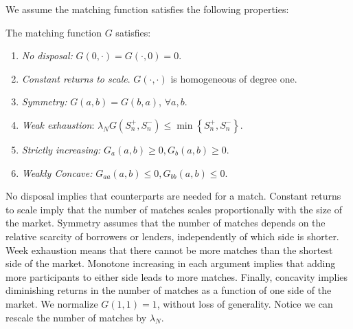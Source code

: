 \documentclass[12pt,american,english,notitlepage]{article}
\begin{document}
We assume the matching function satisfies the following properties:
\begin{assumption} \label{ass:matching} The matching
function $G$ satisfies:
\begin{enumerate}
  \renewcommand{\labelenumi}{\roman{enumi}.}
\item \textit{No disposal:} $G\left(0,\cdot\right)=G\left(\cdot,0\right)=0$.
\item \textit{Constant returns to scale}. $G\left(\cdot,\cdot\right)$ is
homogeneous of degree one.
\item \textit{Symmetry:} $G\left(a,b\right)=G\left(b,a\right)$, $\forall a,b$.
\item \textit{Weak exhaustion}: $\lambda_{N}\ensuremath{G(S_{n}^{+},S_{n}^{-})\le\min\left\{ S_{n}^{+},S_{n}^{-}\right\} }.$
\item \textit{Strictly increasing:} $G_{a}\left(a,b\right)\geq0,G_{b}\left(a,b\right)\geq0$.
\item \textit{Weakly Concave: }$G_{aa}\left(a,b\right)\leq0,G_{bb}\left(a,b\right)\leq0.$
\end{enumerate}
\end{assumption}

No disposal implies that counterparts are needed for a match. Constant returns to scale imply that the number of matches scales proportionally with the size of the market. Symmetry assumes that the number of matches depends on the relative scarcity of borrowers or lenders, independently of which side is shorter. Week exhaustion means that there cannot
be more matches than the shortest side of the market. Monotone increasing in each argument implies that adding more participants to either side leads to more matches. Finally, concavity implies diminishing returns
in the number of matches as a function of one side of the market. We normalize $G\left(1,1\right)=1$, without loss of generality. Notice we can rescale the number of matches by $\lambda_{N}$.
\end{document}
